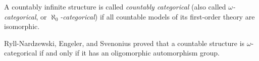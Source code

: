 \documentclass[12pt]{article}
\begin{document}
A countably infinite structure is called \emph{countably categorical} (also called \emph{$\omega$-categorical}, or \emph{$\aleph_0$-categorical})
if all countable models of its first-order theory are isomorphic.

Ryll-Nardzewski, Engeler, and Svenonius proved that a
countable structure is $\omega$-categorical if and only if
it has an oligomorphic automorphism group.
\end{document}
